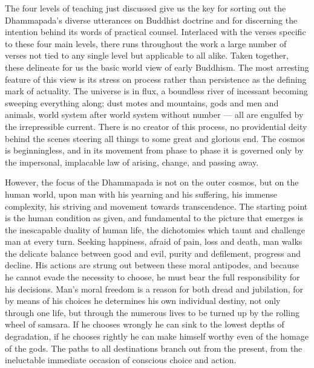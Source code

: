 The four levels of teaching just discussed give us the key for sorting out the Dhammapada's diverse utterances on Buddhist doctrine and for discerning the intention behind its words of practical counsel. Interlaced with the verses specific to these four main levels, there runs throughout the work a large number of verses not tied to any single level but applicable to all alike. Taken together, these delineate for us the basic world view of early Buddhism. The most arresting feature of this view is its stress on process rather than persistence as the defining mark of actuality. The universe is in flux, a boundless river of incessant becoming sweeping everything along; dust motes and mountains, gods and men and animals, world system after world system without number — all are engulfed by the irrepressible current. There is no creator of this process, no providential deity behind the scenes steering all things to some great and glorious end. The cosmos is beginningless, and in its movement from phase to phase it is governed only by the impersonal, implacable law of arising, change, and passing away.

However, the focus of the Dhammapada is not on the outer cosmos, but on the human world, upon man with his yearning and his suffering, his immense complexity, his striving and movement towards transcendence. The starting point is the human condition as given, and fundamental to the picture that emerges is the inescapable duality of human life, the dichotomies which taunt and challenge man at every turn. Seeking happiness, afraid of pain, loss and death, man walks the delicate balance between good and evil, purity and defilement, progress and decline. His actions are strung out between these moral antipodes, and because he cannot evade the necessity to choose, he must bear the full responsibility for his decisions. Man's moral freedom is a reason for both dread and jubilation, for by means of his choices he determines his own individual destiny, not only through one life, but through the numerous lives to be turned up by the rolling wheel of samsara. If he chooses wrongly he can sink to the lowest depths of degradation, if he chooses rightly he can make himself worthy even of the homage of the gods. The paths to all destinations branch out from the present, from the ineluctable immediate occasion of conscious choice and action.

